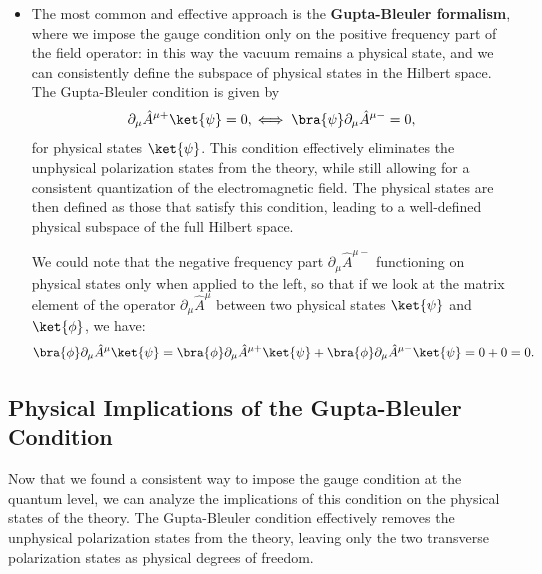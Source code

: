 \begin{itemize}
          \[
              \partial_\mu \hat{A}^{\mu} \ket{0} = \partial_\mu \hat{A}^{\mu +} \ket{0} + \partial_\mu \hat{A}^{\mu -} \ket{0} = \partial_\mu \hat{A}^{\mu +} \ket{0} \neq 0,
          \]
          since when we act on the vacuum with the negative frequency part \(\hat{A}^{\mu -}\), we get zero, but the positive frequency part \(\hat{A}^{\mu +}\) acting on the vacuum does not vanish, leading to a non-zero result. Thus the vacuum state is not physical in this approach, it does not satisfy the gauge condition imposed on the Fock space \(\partial_\mu \hat{A}^{\mu} \ket{0} = 0\).
    \item The most common and effective approach is the \textbf{Gupta-Bleuler formalism}, where we impose the gauge condition only on the positive frequency part of the field operator: in this way the vacuum remains a physical state, and we can consistently define the subspace of physical states in the Hilbert space. The Gupta-Bleuler condition is given by
          \begin{equation}
              \partial_\mu \hat{A}^{\mu +} \ket{\psi} = 0, \iff \bra{\psi} \partial_\mu \hat{A}^{\mu -} = 0,
              \label{eq:gupta-bleuler-condition}
          \end{equation}
          for physical states \(\ket{\psi}\). This condition effectively eliminates the unphysical polarization states from the theory, while still allowing for a consistent quantization of the electromagnetic field. The physical states are then defined as those that satisfy this condition, leading to a well-defined physical subspace of the full Hilbert space.

          We could note that the negative frequency part \(\partial_\mu \hat{A}^{\mu -}\) functioning on physical states only when applied to the left, so that if we look at the matrix element of the operator \(\partial_\mu \hat{A}^{\mu}\) between two physical states \(\ket{\psi}\) and \(\ket{\phi}\), we have:
          \[
              \bra{\phi} \partial_\mu \hat{A}^{\mu} \ket{\psi} = \bra{\phi} \partial_\mu \hat{A}^{\mu +} \ket{\psi} + \bra{\phi} \partial_\mu \hat{A}^{\mu -} \ket{\psi} = 0 + 0 = 0.
          \]
\end{itemize}

\subsection{Physical Implications of the Gupta-Bleuler Condition}

Now that we found a consistent way to impose the gauge condition at the quantum level, we can analyze the implications of this condition on the physical states of the theory. The Gupta-Bleuler condition effectively removes the unphysical polarization states from the theory, leaving only the two transverse polarization states as physical degrees of freedom.

